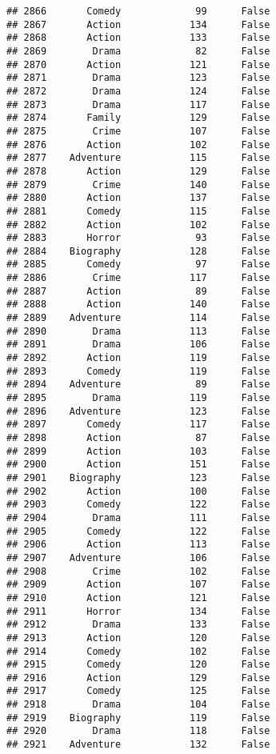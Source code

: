 \documentclass[
]{article}
\begin{document}
\begin{verbatim}
## 2866       Comedy             99      False
## 2867       Action            134      False
## 2868       Action            133      False
## 2869        Drama             82      False
## 2870       Action            121      False
## 2871        Drama            123      False
## 2872        Drama            124      False
## 2873        Drama            117      False
## 2874       Family            129      False
## 2875        Crime            107      False
## 2876       Action            102      False
## 2877    Adventure            115      False
## 2878       Action            129      False
## 2879        Crime            140      False
## 2880       Action            137      False
## 2881       Comedy            115      False
## 2882       Action            102      False
## 2883       Horror             93      False
## 2884    Biography            128      False
## 2885       Comedy             97      False
## 2886        Crime            117      False
## 2887       Action             89      False
## 2888       Action            140      False
## 2889    Adventure            114      False
## 2890        Drama            113      False
## 2891        Drama            106      False
## 2892       Action            119      False
## 2893       Comedy            119      False
## 2894    Adventure             89      False
## 2895        Drama            119      False
## 2896    Adventure            123      False
## 2897       Comedy            117      False
## 2898       Action             87      False
## 2899       Action            103      False
## 2900       Action            151      False
## 2901    Biography            123      False
## 2902       Action            100      False
## 2903       Comedy            122      False
## 2904        Drama            111      False
## 2905       Comedy            122      False
## 2906       Action            113      False
## 2907    Adventure            106      False
## 2908        Crime            102      False
## 2909       Action            107      False
## 2910       Action            121      False
## 2911       Horror            134      False
## 2912        Drama            133      False
## 2913       Action            120      False
## 2914       Comedy            102      False
## 2915       Comedy            120      False
## 2916       Action            129      False
## 2917       Comedy            125      False
## 2918        Drama            104      False
## 2919    Biography            119      False
## 2920        Drama            118      False
## 2921    Adventure            132      False

\end{verbatim}
\end{document}

